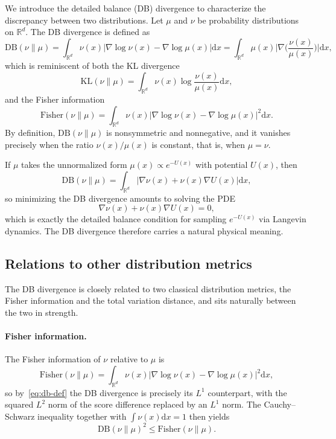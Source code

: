 \documentclass{article}
\newcommand{\Le}{\leqslant}
\newcommand{\D}{\mathrm{d}}
\newcommand{\DB}{\mathrm{DB}}
\newcommand{\KL}{\mathrm{KL}}
\newcommand{\Fish}{\mathrm{Fisher}}
\theoremstyle{plain}
\begin{document}
We introduce the detailed balance (DB) divergence to characterize the discrepancy between two distributions. Let $\mu$ and $\nu$ be probability distributions on $\mathbb R^d$. The DB divergence is defined as
\begin{equation}\label{eq:db-def}
    \DB(\nu\|\mu) = \int_{\mathbb R^d} \nu(x) \bigl|\nabla \log \nu(x) - \nabla \log \mu(x) \bigr| \D x = \int_{\mathbb R^d} \mu(x) \biggl|\nabla\biggl(\frac{\nu(x)}{\mu(x)}\biggr)\biggr| \D x,
\end{equation}
which is reminiscent of both the KL divergence
\begin{equation*}
    \KL(\nu\|\mu) = \int_{\mathbb R^d} \nu(x) \log \frac{\nu(x)}{\mu(x)} \D x,
\end{equation*}
and the Fisher information
\begin{equation*}
    \Fish(\nu\|\mu) = \int_{\mathbb R^d} \nu(x) \bigl|\nabla \log \nu(x) - \nabla \log \mu(x) \bigr|^2 \D x.
\end{equation*}
By definition, $\DB(\nu\|\mu)$ is nonsymmetric and nonnegative, and it vanishes precisely when the ratio $\nu(x)/\mu(x)$ is constant, that is, when $\mu = \nu$.

If $\mu$ takes the unnormalized form $\mu(x) \propto e^{-U(x)}$ with potential $U(x)$, then
\begin{equation*}
    \DB(\nu \| \mu) = \int_{\mathbb R^d} \bigl|\nabla \nu(x) + \nu(x)\nabla U(x) \bigr| \D x,
\end{equation*}
so minimizing the DB divergence amounts to solving the PDE
\begin{equation}\label{eq:db-pde}
    \nabla \nu(x) + \nu(x) \nabla U(x) = 0,
\end{equation}
which is exactly the detailed balance condition for sampling $e^{-U(x)}$ via Langevin dynamics. The DB divergence therefore carries a natural physical meaning.

\subsection{Relations to other distribution metrics}

The DB divergence is closely related to two classical distribution metrics, the Fisher information and the total variation distance, and sits naturally between the two in strength.

\paragraph{Fisher information.}
The Fisher information of $\nu$ relative to $\mu$ is
\begin{equation*}
    \Fish(\nu \| \mu) = \int_{\mathbb R^d} \nu(x) \bigl|\nabla \log \nu(x) - \nabla \log \mu(x) \bigr|^2 \D x,
\end{equation*}
so by~\eqref{eq:db-def} the DB divergence is precisely its $L^1$ counterpart, with the squared $L^2$ norm of the score difference replaced by an $L^1$ norm. The Cauchy--Schwarz inequality together with $\int \nu(x) \D x = 1$ then yields
\begin{equation}\label{eq:db-fisher}
    \DB(\nu \| \mu)^2 \Le \Fish(\nu \| \mu).
\end{equation}
\end{document}
